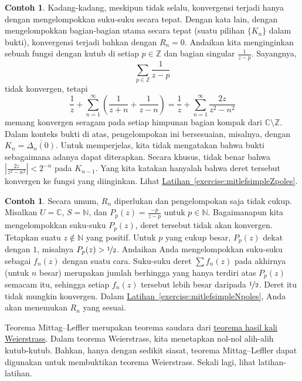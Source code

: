 \documentclass[12pt,openany]{book}
\newcommand{\abs}[1]{\left\lvert {#1} \right\rvert}
\newcommand{\C}{{\mathbb{C}}}
\newcommand{\Z}{{\mathbb{Z}}}
\newcommand{\N}{{\mathbb{N}}}
\theoremstyle{plain}
\theoremstyle{remark}
\theoremstyle{definition}
\theoremstyle{exercise}
\theoremstyle{example}
\newtheorem{example}[thm]{Contoh}
\newcommand{\exerciseref}[1]{\hyperref[#1]{Latihan~\ref*{#1}}}
\begin{document}
\begin{example} \label{example:mitlefsimpleZpoles}
Kadang-kadang, meskipun tidak selalu,
konvergensi terjadi hanya dengan mengelompokkan suku-suku secara tepat.
Dengan kata lain,
dengan mengelompokkan bagian-bagian utama secara tepat
(suatu pilihan $\{ K_n \}$ dalam bukti),
konvergensi terjadi bahkan dengan $R_n=0$.
Andaikan kita menginginkan sebuah fungsi dengan kutub di setiap $p \in \Z$ dan
bagian singular $\frac{1}{z-p}$.  Sayangnya,
\begin{equation*}
\sum_{p\in \Z} \frac{1}{z-p}
\end{equation*}
tidak konvergen, tetapi
\begin{equation*}
\frac{1}{z} + 
\sum_{n=1}^\infty
\left(
\frac{1}{z+n} + 
\frac{1}{z-n}
\right)
=
\frac{1}{z}
+
\sum_{n=1}^\infty
\frac{2z}{z^2-n^2}
\end{equation*}
memang konvergen seragam pada setiap himpunan bagian kompak dari $\C \setminus \Z$.
Dalam konteks bukti di atas, pengelompokan ini bersesuaian, misalnya, dengan
$K_n = \overline{\Delta_n(0)}$.
Untuk memperjelas, kita tidak mengatakan bahwa bukti sebagaimana adanya dapat
diterapkan.  Secara khusus, tidak benar bahwa
$\abs{\frac{2z}{z^2-n^2}} < 2^{-n}$ pada $K_{n-1}$.
Yang kita katakan hanyalah
bahwa deret tersebut konvergen ke fungsi yang diinginkan.
Lihat \exerciseref{exercise:mitlefsimpleZpoles}.
\end{example}

\begin{example}
Secara umum, $R_n$ diperlukan dan pengelompokan saja tidak cukup.
Misalkan $U = \C$, $S = \N$, dan $P_p(z) = \frac{-p}{z-p}$ untuk $p \in \N$.
Bagaimanapun kita mengelompokkan suku-suku $P_p(z)$,
deret tersebut tidak akan konvergen.
Tetapkan suatu $z \notin \N$ yang positif.
Untuk $p$ yang cukup besar,
$P_p(z)$ dekat dengan $1$, misalnya $P_p(z) > \nicefrac{1}{2}$.
Andaikan Anda mengelompokkan suku-suku sebagai $f_n(z)$ dengan suatu cara.
Suku-suku deret $\sum f_n(z)$
pada akhirnya (untuk $n$ besar)
merupakan jumlah berhingga yang hanya terdiri atas $P_p(z)$ semacam itu,
sehingga setiap $f_n(z)$ tersebut lebih besar daripada $\nicefrac{1}{2}$.
Deret itu tidak mungkin konvergen.
Dalam \exerciseref{exercise:mitlefsimpleNpoles}, Anda akan menemukan
$R_n$ yang sesuai.
\end{example}

Teorema Mittag--Leffler merupakan teorema saudara dari
\hyperref[thm:weierprod]{teorema hasil kali Weierstrass}.
Dalam teorema Weierstrass,
kita menetapkan nol-nol alih-alih kutub-kutub.  Bahkan, hanya dengan sedikit
siasat, teorema Mittag--Leffler dapat digunakan untuk membuktikan
teorema Weierstrass.  Sekali lagi, lihat latihan-latihan.
\end{document}
